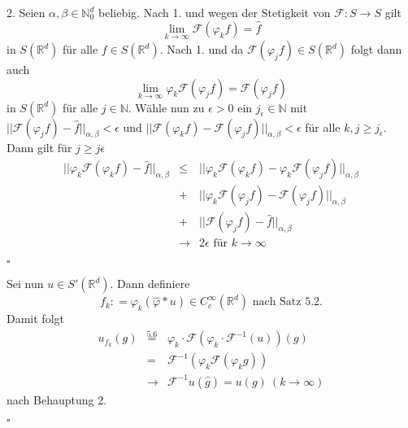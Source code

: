 \documentclass[11pt,a4paper,titlepage, ngerman]{scrartcl}
\numberwithin{equation}{section}
\newcommand{\R}{\mathbb{R}} %
\newcommand{\N}{\mathbb{N}} %
\newcommand{\f}{\hat{f}}
\newcommand{\g}{\hat{g}}
\newcommand{\F}{\mathcal{F}}
\newcommand{\m}{\cdot}
\newcommand{\qed}{\begin{flushright}
		$\square$
	\end{flushright}}
\begin{document}
	2. Seien $\alpha,\beta\in \N_0^d$ beliebig. Nach 1. und wegen der Stetigkeit von $\F: S\rightarrow S$ gilt
	$$\lim\limits_{k\rightarrow\infty}\F(\varphi_k f) = \f$$ 
	in $S(\R^d)$ für alle $f\in S(\R^d)$. Nach 1. und da $\F(\varphi_j f)\in S(\R^d)$ folgt dann auch 
	$$\lim\limits_{k\rightarrow\infty}\varphi_k \F(\varphi_j f) = \F(\varphi_j f)$$
	in $S(\R^d)$ für alle $j\in \N$. Wähle nun zu $\epsilon>0$ ein $j_\epsilon\in \N$ mit $||\F(\varphi_j f)-\f||_{\alpha,\beta} <\epsilon$ und $||\F(\varphi_k f)-\F(\varphi_j f)||_{\alpha,\beta}<\epsilon$ für alle $k,j\geq j_\epsilon$. Dann gilt für $j\geq j\epsilon$
	\begin{eqnarray}
		||\varphi_k\F(\varphi_k f)-\f||_{\alpha,\beta}&\leq & ||\varphi_k\F(\varphi_k f) - \varphi_k\F(\varphi_j f)||_{\alpha,\beta}\nonumber\\
		&+& ||\varphi_k\F(\varphi_j f) - \F(\varphi_j f)||_{\alpha,\beta}\nonumber\\
		&+& ||\F(\varphi_j f) - \f||_{\alpha,\beta}\nonumber\\
		&\rightarrow& 2\epsilon \text{ für } k\rightarrow\infty\nonumber
	\end{eqnarray} %
	\qed
	
	Sei nun $u\in S'(\R^d)$. Dann definiere 
	$$f_k: = \varphi_k(\hat{\varphi}* u)\in C_c^\infty(\R^d) \text{ nach Satz 5.2}.$$
	Damit folgt 
	\begin{eqnarray}
		u_{f_k}(g) &\overset{\text{5.6}}{=}& \varphi_k\m\F(\varphi_k\m\F^{-1}(u))(g) \nonumber\\
		&=& \F^{-1}(\varphi_k\F(\varphi_k g))\nonumber\\
		&\rightarrow& \F^{-1}u(\g) = u(g)~(k\rightarrow\infty)\nonumber
	\end{eqnarray}
	nach Behauptung 2.
	\qed
	
	
	

	\newpage
	
	
	
\end{document}
